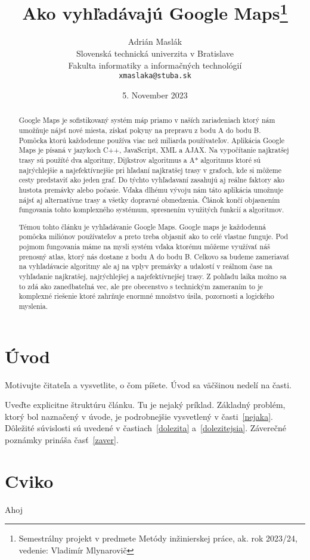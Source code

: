 \documentclass[10pt,twoside,slovak,a4paper]{article}
\title{Ako vyhľadávajú Google Maps\thanks{Semestrálny projekt v predmete Metódy inžinierskej práce, ak. rok 2023/24, vedenie: Vladimír Mlynarovič}} %
\author{Adrián Maslák\\[2pt]
	{\small Slovenská technická univerzita v Bratislave}\\
	{\small Fakulta informatiky a informačných technológií}\\
	{\small \texttt{xmaslaka@stuba.sk}}
	}
\date{\small 5. November 2023} %
\begin{document}
\maketitle

\begin{abstract}
Google Maps je sofistikovaný systém máp priamo v naších zariadeniach ktorý nám umožňuje nájsť nové miesta, získať pokyny na prepravu z bodu A do bodu B. Pomôcka ktorú každodenne používa viac než miliarda používateľov.
	Aplikácia Google Maps je písaná v jazykoch C++, JavaScript, XML a AJAX.  Na vypočítanie najkratšej trasy sú použíté dva algoritmy, Dijkstrov algoritmus a A* algoritmus ktoré sú najrýchlejšie a najefektívnejšie pri hľadaní najkratšej trasy v grafoch, kde si môžeme cesty predstaviť ako jeden graf. Do týchto vyhľadavaní zasahujú aj reálne faktory ako hustota premávky alebo počasie. Vďaka dlhému vývoju nám táto aplikácia umožnuje nájsť aj alternatívne trasy a všetky dopravné obmedzenia.
	Článok končí objasnením fungovania tohto komplexného systémum, spresnením využitých funkcií a algoritmov.

Témou tohto článku je vyhľadávanie Google Maps. Google maps je každodenná pomôcka miliónov používateľov a preto treba objasniť ako to celé vlastne funguje. Pod pojmom fungovania máme na mysli systém vďaka ktorému môžeme využívať náš prenosný atlas, ktorý nás dostane z bodu A do bodu B. Celkovo sa budeme zameriavať na vyhľadávacie algoritmy ale aj na vplyv premávky a udalostí v reálnom čase na vyhľadanie najkratšej, najrýchlejšej a najefektívnejšej trasy. Z pohľadu laika možno sa to zdá ako zanedbateľná vec, ale pre obecenstvo s technickým zameraním to je komplexné riešenie ktoré zahrňuje enormné množstvo úsila, pozornosti a logického myslenia. 
\end{abstract}



\section{Úvod}

Motivujte čitateľa a vysvetlite, o čom píšete. Úvod sa väčšinou nedelí na časti.

Uveďte explicitne štruktúru článku. Tu je nejaký príklad.
Základný problém, ktorý bol naznačený v úvode, je podrobnejšie vysvetlený v časti~\ref{nejaka}.
Dôležité súvislosti sú uvedené v častiach~\ref{dolezita} a~\ref{dolezitejsia}.
Záverečné poznámky prináša časť~\ref{zaver}.

\section{Cviko}
Ahoj
\end{document}
